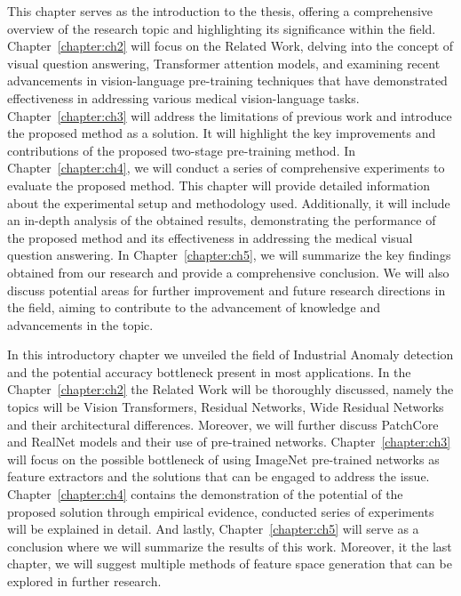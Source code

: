 This chapter serves as the introduction to the thesis, offering a comprehensive overview of the research topic and highlighting its significance within the field. Chapter~\ref{chapter:ch2} will focus on the Related Work, delving into the concept of visual question answering, Transformer attention models, and examining recent advancements in vision-language pre-training techniques that have demonstrated effectiveness in addressing various medical vision-language tasks. Chapter~\ref{chapter:ch3} will address the limitations of previous work and introduce the proposed method as a solution. It will highlight the key improvements and contributions of the proposed two-stage pre-training method. In Chapter~\ref{chapter:ch4}, we will conduct a series of comprehensive experiments to evaluate the proposed method. This chapter will provide detailed information about the experimental setup and methodology used. Additionally, it will include an in-depth analysis of the obtained results, demonstrating the performance of the proposed method and its effectiveness in addressing the medical visual question answering. In Chapter~\ref{chapter:ch5}, we will summarize the key findings obtained from our research and provide a comprehensive conclusion. We will also discuss potential areas for further improvement and future research directions in the field, aiming to contribute to the advancement of knowledge and advancements in the topic.

In this introductory chapter we unveiled the field of Industrial Anomaly detection and the potential accuracy bottleneck present in most applications. In the Chapter~\ref{chapter:ch2} the Related Work will be thoroughly discussed, namely the topics will be Vision Transformers, Residual Networks, Wide Residual Networks and their architectural differences. Moreover, we will further discuss PatchCore and RealNet models and their use of pre-trained networks. Chapter~\ref{chapter:ch3} will focus on the possible bottleneck of using ImageNet pre-trained networks as feature extractors and the solutions that can be engaged to address the issue. Chapter~\ref{chapter:ch4} contains the demonstration of the potential of the proposed solution through empirical evidence, conducted series of experiments will be explained in detail. And lastly, Chapter~\ref{chapter:ch5} will serve as a conclusion where we will summarize the results of this work. Moreover, it the last chapter, we will suggest multiple methods of feature space generation that can be explored in further research.